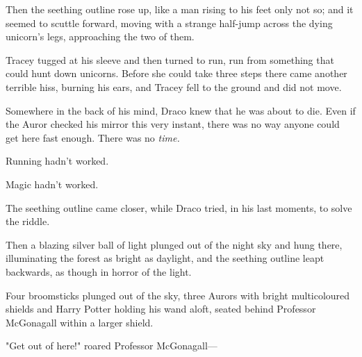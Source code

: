 Then the seething outline rose up, like a man rising to his feet only not so;
and it seemed to scuttle forward, moving with a strange half-jump across the
dying unicorn's legs, approaching the two of them.

Tracey tugged at his sleeve and then turned to run, run from something that
could hunt down unicorns. Before she could take three steps there came another
terrible hiss, burning his ears, and Tracey fell to the ground and did not move.

Somewhere in the back of his mind, Draco knew that he was about to die. Even if
the Auror checked his mirror this very instant, there was no way anyone could
get here fast enough. There was no \emph{time.}

Running hadn't worked.

Magic hadn't worked.

The seething outline came closer, while Draco tried, in his last moments, to
solve the riddle.

Then a blazing silver ball of light plunged out of the night sky and hung
there, illuminating the forest as bright as daylight, and the seething outline
leapt backwards, as though in horror of the light.

Four broomsticks plunged out of the sky, three Aurors with bright multicoloured
shields and Harry Potter holding his wand aloft, seated behind Professor
McGonagall within a larger shield.

"Get out of here!" roared Professor McGonagall---

